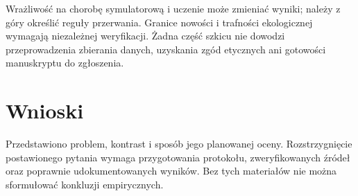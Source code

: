 \documentclass[11pt,a4paper]{article}
\begin{document}
Wrażliwość na chorobę symulatorową i uczenie może zmieniać wyniki; należy z góry określić reguły przerwania. Granice nowości i trafności ekologicznej wymagają niezależnej weryfikacji. Żadna część szkicu nie dowodzi przeprowadzenia zbierania danych, uzyskania zgód etycznych ani gotowości manuskryptu do zgłoszenia.

\section{Wnioski}

Przedstawiono problem, kontrast i sposób jego planowanej oceny. Rozstrzygnięcie postawionego pytania wymaga przygotowania protokołu, zweryfikowanych źródeł oraz poprawnie udokumentowanych wyników. Bez tych materiałów nie można sformułować konkluzji empirycznych.
\end{document}
